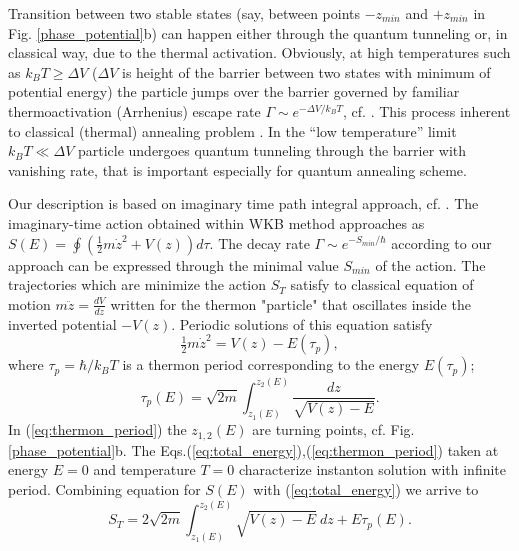 \documentclass[aps, pre, preprint, groupedaddress, superscriptaddress, showkeys, showpacs] {revtex4-1}
\begin{document}
Transition between two stable states (say, between points $-z_{min}$ and $+z_{min}$ in Fig. \ref{phase_potential}b) can happen  either through the quantum tunneling or, in classical way, due to the thermal activation. 
Obviously, at high temperatures such as $k_{B}T\ge\Delta V$ ($\Delta V$ is height of the barrier between two states with minimum of potential energy) the particle jumps over the barrier governed by familiar thermoactivation (Arrhenius) escape rate $\Gamma \sim e^{-\Delta V /k_{B}T}$, cf. \cite{Larkin}. This process inherent to classical (thermal) annealing problem \cite{Das}. 
In the ``low temperature'' limit $k_{B}T\ll\Delta V$ particle undergoes quantum tunneling through the barrier with vanishing rate, that is important especially for quantum annealing scheme. 

Our description is based on imaginary time path integral approach, cf. \cite{Ankerhold}.
The imaginary-time action obtained within WKB method approaches as $S(E) = \oint (\tfrac{1}{2} m \dot{z}^2 + V(z)) d \tau$.
%
%
The decay rate $\Gamma \sim e^{-S_{min}/\hbar}$ according to our approach can be expressed through the minimal value $S_{min}$ of the action.
The trajectories which are minimize the action $S_T$ satisfy to classical equation of motion $m \ddot{z} = \frac{d V}{dz}$ written for the thermon "particle" that  oscillates inside the inverted potential $-V(z)$. 
%
%
Periodic solutions of this equation satisfy
%
\begin{equation}
\tfrac{1}{2} m \dot{z}^2 = V(z) - E(\tau_p),
\label{eq:total_energy}
\end{equation}
%
where $\tau_p = \hbar / k_B T$ is a thermon period corresponding to the energy $E(\tau_p)$;
%
\begin{equation}
\tau_p(E) = \sqrt{2 m} \int_{z_1(E)}^{z_2(E)} \frac{dz}{\sqrt{V(z) - E}}.
\label{eq:thermon_period}
\end{equation}
%
In (\ref{eq:thermon_period}) the $z_{1,2}(E)$ are turning points, cf. Fig. \ref{phase_potential}b.
The Eqs.(\ref{eq:total_energy}),(\ref{eq:thermon_period}) taken at energy $E = 0$ and temperature $T = 0$ characterize instanton solution with infinite period.
Combining  equation for $S(E)$ 
with (\ref{eq:total_energy}) we arrive to 
%
\begin{equation}
S_T = 2 \sqrt{2 m} \int_{z_1(E)}^{z_2(E)} \sqrt{V(z) - E} ~dz + E \tau_p (E).
\label{eq:thermon_action_2}
\end{equation}
%
\end{document}
